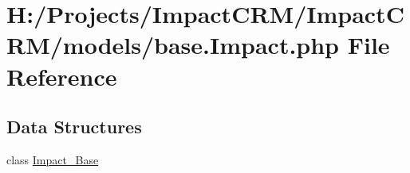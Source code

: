 \hypertarget{base_8Impact_8php}{
\section{H:/Projects/ImpactCRM/ImpactCRM/models/base.Impact.php File Reference}
\label{base_8Impact_8php}
}
\subsection*{Data Structures}
\begin{DoxyCompactItemize}
\item 
class \hyperlink{classImpact__Base}{Impact\_\-Base}
\end{DoxyCompactItemize}
